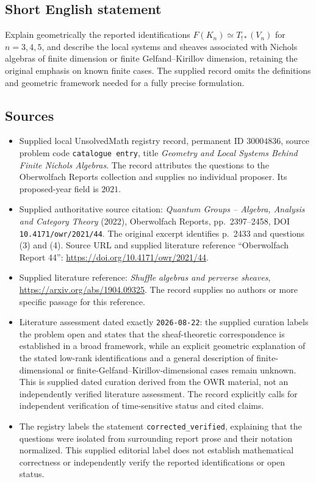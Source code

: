 \documentclass[11pt]{article}
\begin{document}
\subsection{Short English statement}
Explain geometrically the reported identifications \(F(K_n)\simeq T_{!*}(V_n)\) for \(n=3,4,5\), and describe the local systems and sheaves associated with Nichols algebras of finite dimension or finite Gelfand--Kirillov dimension, retaining the original emphasis on known finite cases. The supplied record omits the definitions and geometric framework needed for a fully precise formulation.
\subsection{Sources}
\begin{itemize}
\item Supplied local UnsolvedMath registry record, permanent ID \(30004836\), source problem code \texttt{catalogue entry}, title \emph{Geometry and Local Systems Behind Finite Nichols Algebras}. The record attributes the questions to the Oberwolfach Reports collection and supplies no individual proposer. Its proposed-year field is \(2021\).
\item Supplied authoritative source citation: \emph{Quantum Groups -- Algebra, Analysis and Category Theory} (2022), Oberwolfach Reports, pp.~2397--2458, DOI \texttt{10.4171/owr/2021/44}. The original excerpt identifies p.~2433 and questions (3) and (4). Source URL and supplied literature reference ``Oberwolfach Report 44'': \url{https://doi.org/10.4171/owr/2021/44}.
\item Supplied literature reference: \emph{Shuffle algebras and perverse sheaves}, \url{https://arxiv.org/abs/1904.09325}. The record supplies no authors or more specific passage for this reference.
\item Literature assessment dated exactly \texttt{2026-08-22}: the supplied curation labels the problem open and states that the sheaf-theoretic correspondence is established in a broad framework, while an explicit geometric explanation of the stated low-rank identifications and a general description of finite-dimensional or finite-Gelfand--Kirillov-dimensional cases remain unknown. This is supplied dated curation derived from the OWR material, not an independently verified literature assessment. The record explicitly calls for independent verification of time-sensitive status and cited claims.
\item The registry labels the statement \texttt{corrected\_verified}, explaining that the questions were isolated from surrounding report prose and their notation normalized. This supplied editorial label does not establish mathematical correctness or independently verify the reported identifications or open status.
\end{itemize}
\end{document}
